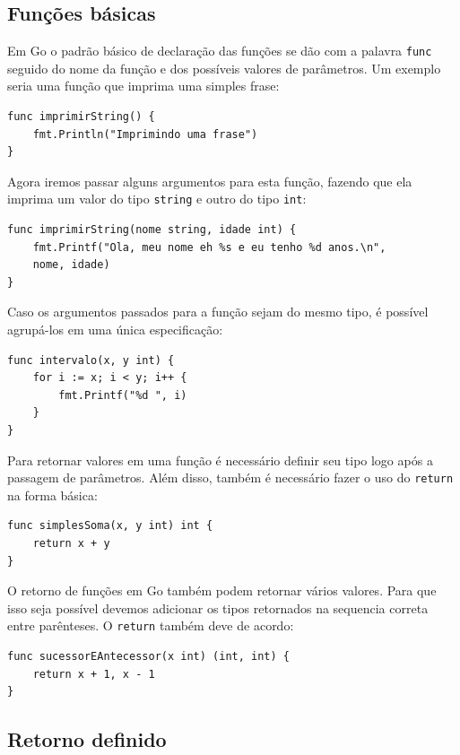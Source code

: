 \documentclass{SBCbookchapter}
\begin{document}
\subsection{Funções básicas}

Em Go o padrão básico de declaração das funções se dão com a palavra \texttt{func} seguido do nome da função e dos possíveis valores de parâmetros. Um exemplo seria uma função que imprima uma simples frase:

\begin{lstlisting}
func imprimirString() {
	fmt.Println("Imprimindo uma frase")
}
\end{lstlisting}

Agora iremos passar alguns argumentos para esta função, fazendo que ela imprima um valor do tipo \texttt{string} e outro do tipo \texttt{int}:

\begin{lstlisting}
func imprimirString(nome string, idade int) {
	fmt.Printf("Ola, meu nome eh %s e eu tenho %d anos.\n",
	nome, idade)
}
\end{lstlisting}

Caso os argumentos passados para a função sejam do mesmo tipo, é possível agrupá-los em uma única especificação:

\begin{lstlisting}
func intervalo(x, y int) {
	for i := x; i < y; i++ {
		fmt.Printf("%d ", i)
	}
}
\end{lstlisting}

Para retornar valores em uma função é necessário definir seu tipo logo após a passagem de parâmetros. Além disso, também é necessário fazer o uso do \texttt{return} na forma básica:

\begin{lstlisting}
func simplesSoma(x, y int) int {
	return x + y
}
\end{lstlisting}

O retorno de funções em Go também podem retornar vários valores. Para que isso seja possível devemos adicionar os tipos retornados na sequencia correta entre parênteses. O \texttt{return} também deve de acordo:

\begin{lstlisting}
func sucessorEAntecessor(x int) (int, int) {
	return x + 1, x - 1
}
\end{lstlisting}

\subsection{Retorno definido}
\end{document}
